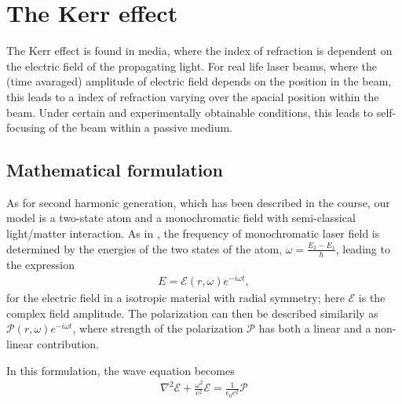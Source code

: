 \chapter{The Kerr effect}
\label{cha:kerr}

The Kerr effect is found in media, where the index of refraction is
dependent on the electric field of the propagating light. For real
life laser beams, where the (time avaraged) amplitude of electric
field depends on the position in the beam, this leads to a index of
refraction varying over the spacial position within the beam. Under
certain and experimentally obtainable conditions, this leads to
self-focusing of the beam within a passive medium.


\section{Mathematical formulation}
\label{sec:kerr-math}

As for second harmonic generation, which has been described in the
course, our model is a two-state atom and a monochromatic field with
semi-classical light/matter interaction. As in \cite{milonni}, the
frequency of monochromatic laser field is determined by the energies
of the two states of the atom, $\omega = \frac{E_2 - E_1}{\hbar}$,
leading to the expression
\begin{align}
  \label{eq:kerr-laser-field}
  E = \mathcal{E}(r, \omega) e^{-i \omega t},
\end{align}
for the electric field in a isotropic material with radial symmetry;
here $\mathcal{E}$ is the complex field amplitude. The polarization
can then be described similarily as $\mathcal{P}(r, \omega) e^{-i
  \omega t}$, where strength of the polarization $\mathcal{P}$ has
both a linear and a non-linear contribution.

In this formulation, the wave equation becomes
\begin{align}
  \label{eq:kerr-wave-eqn}
  \nabla^2 \mathcal{E} + \frac{\omega^2}{c^2} \mathcal{E}
  = \frac{1}{\epsilon_0 c^2} \mathcal{P}
\end{align}





